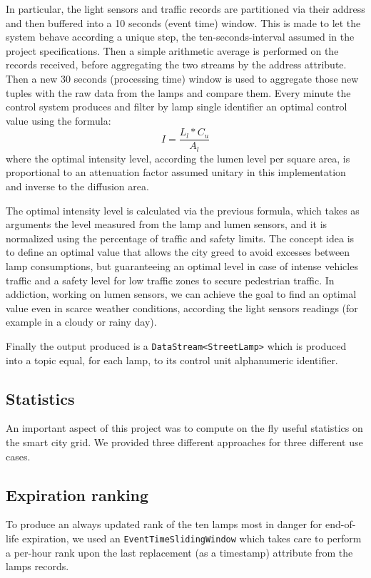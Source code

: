 In particular, the light sensors and traffic records are partitioned via their address and then buffered into a 10 seconds (event time) window. This is made to let the system behave according a unique step, the ten-seconds-interval assumed in the project specifications. Then a simple arithmetic average is performed on the records received, before aggregating the two streams by the address attribute. Then a new 30 seconds (processing time) window is used to aggregate those new tuples with the raw data from the lamps and compare them. Every minute the control system produces and filter by lamp single identifier an optimal control value using the formula:
	$$I = \frac{L_l*C_u}{A_l}$$
where the optimal intensity level, according the lumen level per square area, is proportional to an attenuation factor assumed unitary in this implementation and inverse to the diffusion area.

The optimal intensity level is calculated via the previous formula, which takes as arguments the level measured from the lamp and lumen sensors, and it is normalized using the percentage of traffic and safety limits. The concept idea is to define an optimal value that allows the city greed to avoid excesses between lamp consumptions, but guaranteeing an optimal level in case of intense vehicles traffic and a safety level for low traffic zones to secure pedestrian traffic. In addiction, working on lumen sensors, we can achieve the goal to find an optimal value even in scarce weather conditions, according the light sensors readings (for example in a cloudy or rainy day).

Finally the output produced is a \texttt{DataStream<StreetLamp>} which is produced into a topic equal, for each lamp, to its control unit alphanumeric identifier.

\subsection{Statistics}
An important aspect of this project was to compute on the fly useful statistics on the smart city grid. We provided three different approaches for three different use cases.
\subsection*{Expiration ranking}
To produce an always updated rank of the ten lamps most in danger for end-of-life expiration, we used an \texttt{EventTimeSlidingWindow} which takes care to perform a per-hour rank upon the last replacement (as a timestamp) attribute from the lamps records.
